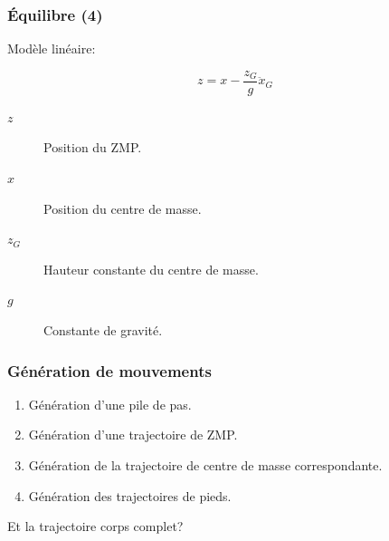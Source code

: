 \documentclass[14pt,utf8,hyperref={pdfpagelabels=false}]{beamer}
\begin{document}
\begin{slideDecision}
  \frametitle{Équilibre (4)}


  \begin{changeleftmargin}{1.1cm}
  \begin{center}

    Modèle linéaire:

    \begin{equation*}
      z = x - \frac{z_G}{g} \ddot{x}_G
    \end{equation*}

    \begin{description}
    \item[$z$] Position du ZMP.
    \item[$x$] Position du centre de masse.
    \item[$z_G$] Hauteur constante du centre de masse.
    \item[$g$] Constante de gravité.
    \end{description}
  \end{center}
  \end{changeleftmargin}
\end{slideDecision}

\begin{slideDecision}
  \frametitle{Génération de mouvements}


  \begin{changeleftmargin}{1.5cm}
  \begin{center}
    \begin{enumerate}
      \item Génération d'une pile de pas.
      \item Génération d'une trajectoire de ZMP.
      \item Génération de la trajectoire de centre de masse
        correspondante.
      \item Génération des trajectoires de pieds.
    \end{enumerate}

    \bigskip

    \alert{Et la trajectoire corps complet?}
  \end{center}
  \end{changeleftmargin}
\end{slideDecision}
\end{document}
